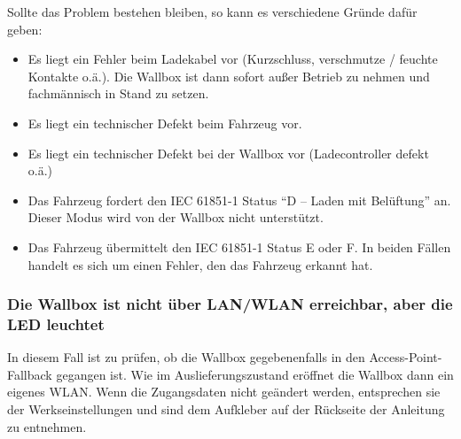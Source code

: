 \documentclass[a4paper,10pt]{article}
\begin{document}
\begin{multicols*}{2}
	Sollte das Problem bestehen bleiben, so kann es verschiedene Gründe dafür
	geben:
	\begin{itemize}
		\item Es liegt ein Fehler beim Ladekabel vor (Kurzschluss, verschmutze / feuchte
		      Kontakte o.ä.). Die Wallbox ist dann sofort außer Betrieb zu nehmen und
		      fachmännisch in Stand zu setzen.
		\item Es liegt ein technischer Defekt beim Fahrzeug vor.
		\item Es liegt ein technischer Defekt bei der Wallbox vor (Ladecontroller defekt o.ä.)
		\item Das Fahrzeug fordert den IEC 61851-1 Status \enquote{D – Laden mit Belüftung}
		      an. Dieser Modus wird von der Wallbox nicht unterstützt.
		\item Das Fahrzeug übermittelt den IEC 61851-1 Status E oder F. In beiden Fällen
		      handelt es sich um einen Fehler, den das Fahrzeug erkannt hat.
	\end{itemize}

	\subsubsection*{Die Wallbox ist nicht über LAN/WLAN erreichbar, aber die LED leuchtet}
	In diesem Fall ist zu prüfen, ob die Wallbox gegebenenfalls in den Access-Point-Fallback
	gegangen ist. Wie im Auslieferungszustand eröffnet die Wallbox dann ein eigenes
	WLAN. Wenn die Zugangsdaten nicht geändert werden, entsprechen sie der Werkseinstellungen und sind dem
	Aufkleber auf der Rückseite der Anleitung zu entnehmen.


\end{multicols*}
\end{document}
